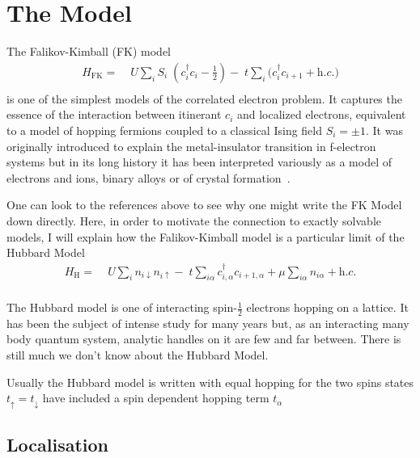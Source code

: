 \hypertarget{the-model}{%
\section{The Model}\label{the-model}}

The Falikov-Kimball (FK) model \[\begin{aligned}
H_{\mathrm{FK}} = & \;U \sum_{i} S_i\;(c^\dagger_{i}c_{i} - \tfrac{1}{2}) -\;t \sum_{i} (c^\dagger_{i}c_{i+1} + \textit{h.c.)}\\ 
\end{aligned}\] is one of the simplest models of the correlated electron problem. It captures the essence of the interaction between itinerant \(c_i\) and localized electrons, equivalent to a model of hopping fermions coupled to a classical Ising field \(S_i = \pm 1\). It was originally introduced to explain the metal-insulator transition in f-electron systems but in its long history it has been interpreted variously as a model of electrons and ions, binary alloys or of crystal formation~\autocite{hubbardj.ElectronCorrelationsNarrow1963,falicovSimpleModelSemiconductorMetal1969,gruberFalicovKimballModelReview1996,gruberFalicovKimballModel2006}.

One can look to the references above to see why one might write the FK Model down directly. Here, in order to motivate the connection to exactly solvable models, I will explain how the Falikov-Kimball model is a particular limit of the Hubbard Model \[\begin{aligned}
H_{\mathrm{H}} = & \;U \sum_{i} n_{i\downarrow} n_{i\uparrow} -\;t \sum_{i\alpha} c^\dagger_{i,\alpha}c_{i+1,\alpha} + \mu \sum_{i\alpha} n_{i\alpha} + \textit{h.c.} \\ 
\end{aligned}\]

The Hubbard model is one of interacting spin-\(\tfrac{1}{2}\) electrons hopping on a lattice. It has been the subject of intense study for many years but, as an interacting many body quantum system, analytic handles on it are few and far between. There is still much we don't know about the Hubbard Model.

Usually the Hubbard model is written with equal hopping for the two spins states \(t_\uparrow = t_\downarrow\) have included a spin dependent hopping term \(t_\alpha\)

\hypertarget{localisation}{%
\subsection{Localisation}\label{localisation}}

